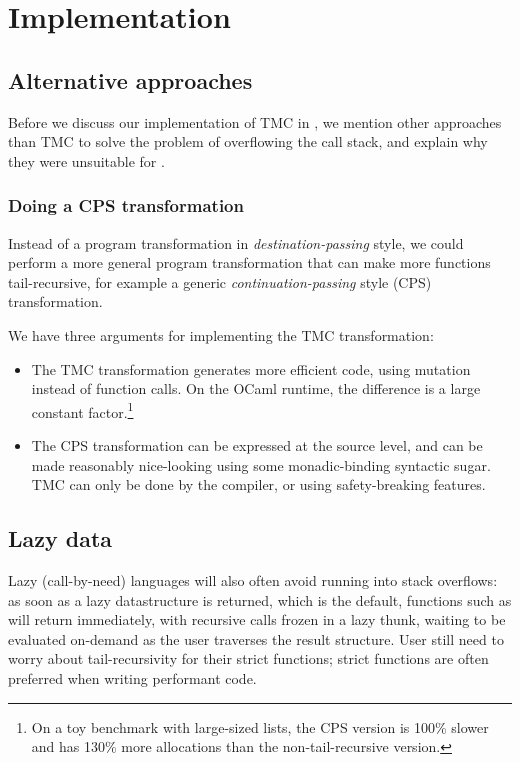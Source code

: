\section{\OCaml Implementation}
\label{sec:implementation}

\subsection{Alternative approaches}

Before we discuss our implementation of TMC in \OCaml, we mention other approaches than TMC to solve the problem of overflowing the call stack, and explain why they were unsuitable for \OCaml.

\subsubsection{Doing a CPS transformation}

Instead of a program transformation in \emph{destination-passing} style, we could perform a more general program transformation that can make more functions tail-recursive, for example a generic \emph{continuation-passing} style (CPS) transformation.

We have three arguments for implementing the TMC transformation:
\begin{itemize}
\item The TMC transformation generates more efficient code, using mutation instead of function calls. On the OCaml runtime, the difference is a large constant factor.\footnote{On a toy benchmark with large-sized lists, the CPS version is 100\% slower and has 130\% more allocations than the non-tail-recursive version.}

\item The CPS transformation can be expressed at the source level, and can be made reasonably nice-looking using some monadic-binding syntactic sugar. TMC can only be done by the compiler, or using safety-breaking features.
\end{itemize}

\subsection{Lazy data}

Lazy (call-by-need) languages will also often avoid running into stack overflows: as soon as a lazy datastructure is returned, which is the default, functions such as  will return immediately, with recursive calls frozen in a lazy thunk, waiting to be evaluated on-demand as the user traverses the result structure.
User still need to worry about tail-recursivity for their strict functions; strict functions are often preferred when writing performant code.

